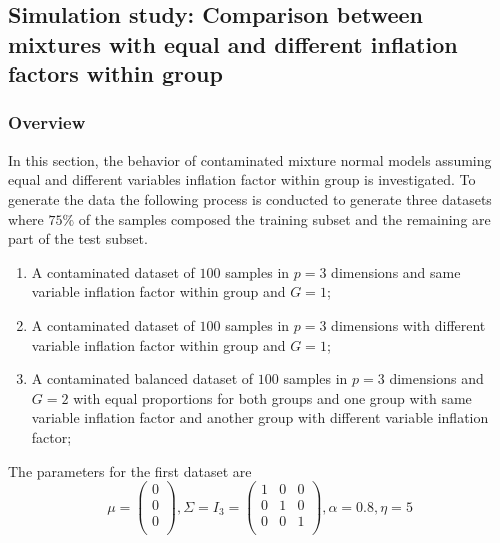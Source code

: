 \documentclass[
]{article}
\providecommand{\tightlist}{%
  \setlength{\itemsep}{0pt}\setlength{\parskip}{0pt}}
\begin{document}
\hypertarget{simulation-study-comparison-between-mixtures-with-equal-and-different-inflation-factors-within-group}{%
\subsection{Simulation study: Comparison between mixtures with equal and
different inflation factors within
group}\label{simulation-study-comparison-between-mixtures-with-equal-and-different-inflation-factors-within-group}}

\hypertarget{overview}{%
\subsubsection{Overview}\label{overview}}

In this section, the behavior of contaminated mixture normal models
assuming equal and different variables inflation factor within group is
investigated. To generate the data the following process is conducted to
generate three datasets where \(75\%\) of the samples composed the
training subset and the remaining are part of the test subset.

\begin{enumerate}
\def\labelenumi{\alph{enumi})}
\tightlist
\item
  A contaminated dataset of \(100\) samples in \(p=3\) dimensions and
  same variable inflation factor within group and \(G=1\);
\item
  A contaminated dataset of \(100\) samples in \(p=3\) dimensions with
  different variable inflation factor within group and \(G=1\);
\item
  A contaminated balanced dataset of \(100\) samples in \(p=3\)
  dimensions and \(G=2\) with equal proportions for both groups and one
  group with same variable inflation factor and another group with
  different variable inflation factor;
\end{enumerate}

The parameters for the first dataset are \[
\mu = \begin{pmatrix} 0 \\ 0 \\ 0\\ \end{pmatrix} , \Sigma = I_{3} = \begin{pmatrix} 1 & 0 & 0  \\ 0 & 1 & 0  \\ 0 & 0 & 1   \\ \end{pmatrix}, \alpha = 0.8, \eta = 5
\]
\end{document}
